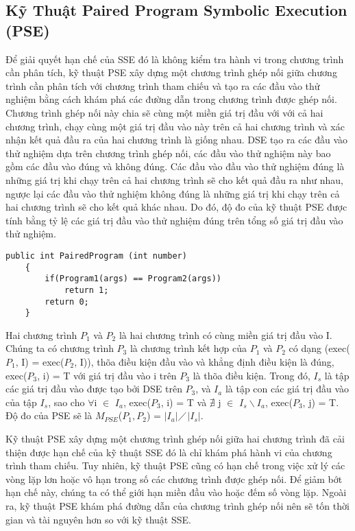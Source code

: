 \subsection{Kỹ Thuật Paired Program Symbolic Execution (PSE)}
Để giải quyết hạn chế của SSE đó là không kiểm tra hành vi trong chương trình cần phân tích, kỹ thuật PSE xây dựng một chương trình ghép nối giữa chương trình cần phân tích với chương trình tham chiếu và tạo ra các đầu vào thử nghiệm bằng cách khám phá các đường dẫn trong chương trình được ghép nối. Chương trình ghép nối này chia sẽ cùng một miền giá trị đầu với với cả hai chương trình, chạy cùng một giá trị đầu vào này trên cả hai chương trình và xác nhận kết quả đầu ra của hai chương trình là giống nhau. DSE tạo ra các đầu vào thử nghiệm dựa trên chương trình ghép nối, các đầu vào thử nghiệm này bao gồm các đầu vào đúng và không đúng. Các đầu vào đầu vào thử nghiệm đúng là những giá trị khi chạy trên cả hai chương trình sẽ cho kết quả đầu ra như nhau, ngược lại các đầu vào thử nghiệm không đúng là những giá trị khi chạy trên cả hai chương trình sẽ cho kết quả khác nhau. Do đó, độ đo của kỹ thuật PSE được tính bằng tỷ lệ các giá trị đầu vào thử nghiệm đúng trên tổng số giá trị đầu vào thử nghiệm. 

\begin{lstlisting}[caption={Chương trình ghép nối $P_{}$}, label={Script}]
	public int PairedProgram (int number)
	{
		if(Program1(args) == Program2(args))
			return 1;
		return 0;
	}
\end{lstlisting}

\begin{definition}
  Hai chương trình $P_{1}$ và $P_{2}$ là hai chương trình có cùng miền
  giá trị đầu vào I. Chúng ta có chương trình $P_{3}$ là chương trình
  kết hợp của $P_{1}$ và $P_{2}$ có dạng (exec($P_{1}$, I) =
  exec($P_{2}$, I)), thõa điều kiện đầu vào và khẳng định điều kiện là
  đúng, exec($P_{3}$, i) = T với giá trị đầu vào i trên $P_{3}$ là
  thõa điều kiện. Trong đó, $I_{s}$ là tập các giá trị đầu vào được
  tạo bởi DSE trên $P_{3}$, và $I_{a}$ là tập con các giá trị đầu vào
  của tập $I_{s}$, sao cho $\forall$i $\in$ $I_{a}$, exec($P_{3}$, i)
  = T và $\nexists $ j $\in$ $I_{s} \backslash I_{a}$, exec($P_{3}$,
  j) = T. Độ đo của PSE sẽ là $M_{PSE}$($P_{1},P_{2}$) =
  $\left|I_{a}\right|$$\diagup$$\left|I_{s}\right|$.
\end{definition}

Kỹ thuật PSE xây dựng một chương trình ghép nối giữa hai chương trình đã cải thiện được hạn chế của kỹ thuật SSE đó là chỉ khám phá hành vi của chương trình tham chiếu. Tuy nhiên, kỹ thuật PSE cũng có hạn chế trong việc xử lý các vòng lặp lơn hoặc vô hạn trong số các chương trình được ghép nối. Để giảm bớt hạn chế này, chúng ta có thể giới hạn miền đầu vào hoặc đếm số vòng lặp. Ngoài ra, kỹ thuật PSE khám phá đường dẫn của chương trình ghép nối nên sẽ tốn thời gian và tài nguyên hơn so với kỹ thuật SSE.

